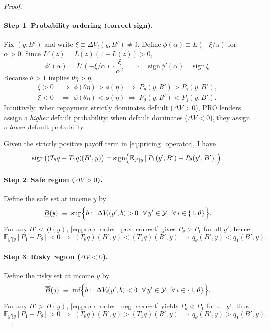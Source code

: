 \documentclass[12pt]{article}
\theoremstyle{plain}
\newcommand{\E}{\mathbb{E}}
\newcommand{\Y}{\mathcal{Y}}
\begin{document}
\begin{proof}
	\paragraph{Step 1: Probability ordering (correct sign).}
	Fix $(y,B')$ and write $\xi\equiv \Delta V_i(y,B')\neq 0$. Define
	$\phi(\alpha)\equiv L(-\xi/\alpha)$ for $\alpha>0$. Since
	$L'(z)=L(z)(1-L(z))>0$,
	\[
		\phi'(\alpha)=L'(-\xi/\alpha)\cdot\frac{\xi}{\alpha^2}
		\quad\Rightarrow\quad
		\mathrm{sign}\,\phi'(\alpha)=\mathrm{sign}\,\xi.
	\]
	Because $\theta>1$ implies $\theta\eta>\eta$,
	\begin{align}
		\xi>0 & \;\Rightarrow\; \phi(\theta\eta)>\phi(\eta)
		\;\Rightarrow\; P_\theta(y,B')>P_1(y,B'),
		\label{eq:prob_order_pos_correct}                   \\
		\xi<0 & \;\Rightarrow\; \phi(\theta\eta)<\phi(\eta)
		\;\Rightarrow\; P_\theta(y,B')<P_1(y,B').
		\label{eq:prob_order_neg_correct}
	\end{align}
	Intuitively: when repayment strictly dominates default (\(\Delta V>0\)), PRO lenders assign a \emph{higher} default probability; when default dominates (\(\Delta V<0\)), they assign a \emph{lower} default probability.

	Given the strictly positive payoff term in \eqref{eq:pricing_operator}, I have
	\begin{equation}
		\mathrm{sign}\bigl((T_\theta q-T_1 q)(B',y)\bigr)
		= \mathrm{sign}\Bigl(\E_{y'|y}\,[\,P_1(y',B')-P_\theta(y',B')\,]\Bigr).
		\label{eq:operator_sign_correct}
	\end{equation}

	\paragraph{Step 2: Safe region (\(\Delta V>0\)).}
	Define the safe set at income \(y\) by
	\[
		\underline{B}(y)\;\equiv\;\sup\Bigl\{b:\ \Delta V_i(y',b)>0\ \ \forall\,y'\in\Y,\ \forall\,i\in\{1,\theta\}\Bigr\}.
	\]
	For any \(B'<\underline{B}(y)\), \eqref{eq:prob_order_pos_correct} gives
	\(P_\theta>P_1\) for all $y'$; hence
	\[
		\E_{y'|y}[P_1-P_\theta]<0
		\ \Rightarrow\
		(T_\theta q)(B',y)<(T_1 q)(B',y)
		\ \Rightarrow\
		q_\theta(B',y)<q_1(B',y).
	\]

	\paragraph{Step 3: Risky region (\(\Delta V<0\)).}
	Define the risky set at income \(y\) by
	\[
		\overline{B}(y)\;\equiv\;\inf\Bigl\{b:\ \Delta V_i(y',b)<0\ \ \forall\,y'\in\Y,\ \forall\,i\in\{1,\theta\}\Bigr\}.
	\]
	For any \(B'>\overline{B}(y)\), \eqref{eq:prob_order_neg_correct} yields
	\(P_\theta<P_1\) for all $y'$; thus
	\[
		\E_{y'|y}[P_1-P_\theta]>0
		\ \Rightarrow\
		(T_\theta q)(B',y)>(T_1 q)(B',y)
		\ \Rightarrow\
		q_\theta(B',y)>q_1(B',y).
	\]


\end{proof}
\end{document}
